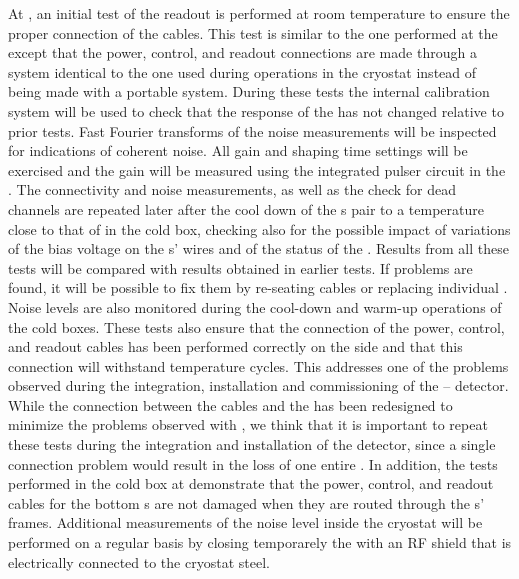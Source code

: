 At \surf, an initial test of the readout is performed at room temperature to
ensure the proper connection of the cables. This test is similar to the one
performed at the  except that the power, control, and readout
connections are made through a system identical to the one used during
operations in the cryostat instead of being made with a portable system.
During these tests the internal calibration system will be used to check
that the response of the  has not changed relative to prior
tests. Fast Fourier transforms of the noise measurements will be inspected
for indications of coherent noise. All  gain and shaping time
settings will be exercised and the gain will be measured using the
integrated pulser circuit in the  . 
The connectivity and noise measurements, as well as the check for dead
channels are repeated later after the cool down of the s pair
to a temperature close to that of \lntwo in the cold box, 
checking also for the possible impact of variations of the bias voltage
on the s' wires and of the status of the .
Results from all these tests will be compared with results obtained 
in earlier  tests.  If problems are found, it will be possible 
to fix them by re-seating cables or replacing individual .
Noise levels are also monitored during the cool-down and warm-up 
operations of the cold boxes. These tests also ensure that the connection
of the power, control, and readout cables has been performed correctly
on the  side and that this connection will withstand temperature 
cycles. This addresses one of the problems observed during the integration,
installation and commissioning of the -- 
detector. While the connection between the cables and the 
has been redesigned to minimize the problems observed with ,
we think that it is important to repeat these tests during the integration
and installation of the detector, since a single connection problem would
result in the loss of one entire . In addition, the tests 
performed in the cold box at \surf demonstrate that the power, control, and
readout cables for the bottom s are not damaged when they are routed 
through the s' frames. Additional measurements of the noise
level inside the cryostat will be performed on a regular basis by closing 
temporarely the  with an RF shield that is electrically connected 
to the cryostat steel. 

